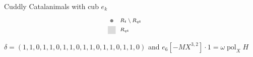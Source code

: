 \documentclass{beamer}
\DeclareMathOperator{\pol}{pol}
\newcounter{c}
\begin{document}
\begin{frame}{Cuddly Catalanimals with cub \(e_k\)}
\[\begin{array}{c@{\quad\quad}cr}
{\begin{tikzpicture}[scale = .39]
\begin{scope}[yshift = -34*2]
\draw[thin, black!0] (2,-1) -- (3,-1);
\draw[thin, black!0] (2,-1) -- (2,-2);
\draw[thin, black!0] (2,-2) -- (3,-2);
\draw[thin, black!0] (3,-2) -- (3,-1);
\draw[draw = none, fill = gray!100] (2+0.5, -1-0.5) circle (.2);
\node[anchor = west] at (3,-1.5) {\scriptsize  \  $R_t \setminus R_{qt}$};
\end{scope}
\begin{scope}[yshift = -34*3]
\draw[draw = none, fill = black!14] (2,-1) rectangle (3,-2);
\node[anchor = west] at (3,-1.5) {\scriptsize \  $R_{qt}$};
\end{scope}
\end{tikzpicture}}
  \end{array}
  \]
  \(\delta = (1,1,0,1,1,0,1,1,0,1,1,0,1,1,0,1,1,0)\) and
  \(e_6[-MX^{3,2}] \cdot 1 = \omega \pol_X H\)
\end{frame}
\end{document}
